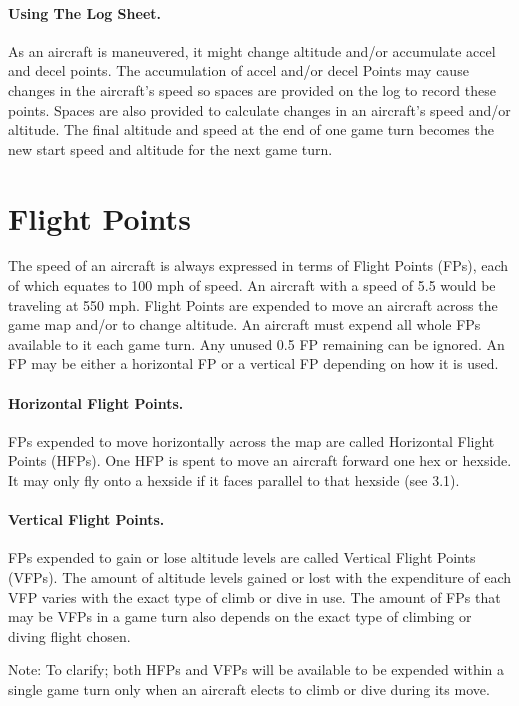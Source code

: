 \paragraph{Using The Log Sheet.} 
As an aircraft is maneuvered, it might change altitude and/or accumulate accel and decel points. The accumulation of accel and/or decel Points may cause changes in the aircraft's speed so spaces are provided on the log to record these points. Spaces are also provided to calculate changes in an aircraft's speed and/or altitude. The final altitude and speed at the end of one game turn becomes the new start speed and altitude for the next game turn.

\section{Flight Points}
\label{rule:flight-points}

The speed of an aircraft is always expressed in terms of Flight Points (FPs), each of which equates to 100 mph of speed. An aircraft with a speed of 5.5 would be traveling at 550 mph. Flight Points are expended to move an aircraft across the game map and/or to change altitude.  An aircraft must expend all whole FPs available to it each game turn. Any unused 0.5 FP remaining can be ignored. An FP may be either a horizontal FP or a vertical FP depending on how it is used.

\paragraph{Horizontal Flight Points.} 
FPs expended to move horizontally across the map are called Horizontal Flight Points (HFPs). One HFP is spent to move an aircraft forward one hex or hexside. It may only fly onto a hexside if it faces parallel to that hexside (see 3.1).

\paragraph{Vertical Flight Points.} 
FPs expended to gain or lose altitude levels are called Vertical Flight Points (VFPs). The amount of altitude levels gained or lost with the expenditure of each VFP varies with the exact type of climb or dive in use.  The amount of FPs that may be VFPs in a game turn also depends on the exact type of climbing or diving flight chosen.

Note: To clarify; both HFPs and VFPs will be available to be expended within a single game turn only when an aircraft elects to climb or dive during its move.

